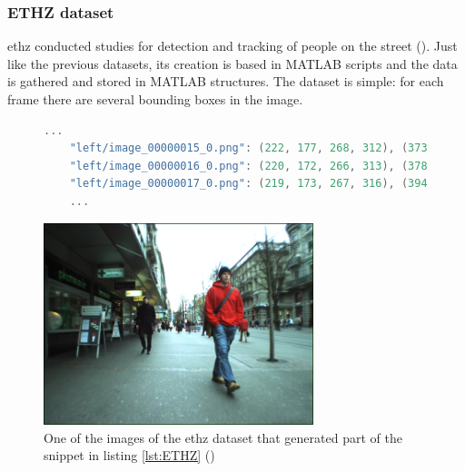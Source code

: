 \subsubsection{ETHZ dataset}
\gls{ethz} conducted studies for detection and tracking of people on the street (\cite{Ess2009}). Just like the previous datasets, its creation is based in MATLAB scripts and the data is gathered and stored in MATLAB structures. The dataset is simple: for each frame there are several bounding boxes in the image.
\begin{figure}
\begin{center}
	\begin{lstlisting}[label={lst:ETHZ}, caption={ETHZ dataset dataset file snippet (\cite{ETHZEidgenossischeTechnischeHochschuleZurich})},language=c++]
	...
	"left/image_00000015_0.png": (222, 177, 268, 312), (373, 105, 463, 393), (458, 220, 487, 285), (310, 225, 327, 265), (335, 228, 352, 264), (267, 228, 281, 261);
	"left/image_00000016_0.png": (220, 172, 266, 313), (378, 407, 476, 102), (462, 219, 486, 285), (312, 223, 327, 264), (337, 226, 352, 262), (267, 231, 279, 260);
	"left/image_00000017_0.png": (219, 173, 267, 316), (394, 94, 489, 423), (313, 222, 330, 262), (338, 227, 354, 262), (267, 228, 279, 260);
	...	\end{lstlisting}
\end{center}
\end{figure}

\begin{figure}[htp]
	
	\centering
	\includegraphics[width=0.7\textwidth]{capstate/imgs/image_00000016_0.png}
	
	\caption{One of the images of the \gls{ethz} dataset that generated part of the snippet in listing \ref{lst:ETHZ} (\cite{ETHZEidgenossischeTechnischeHochschuleZurich})}
	\label{fig:ETHZ}
	
\end{figure}

